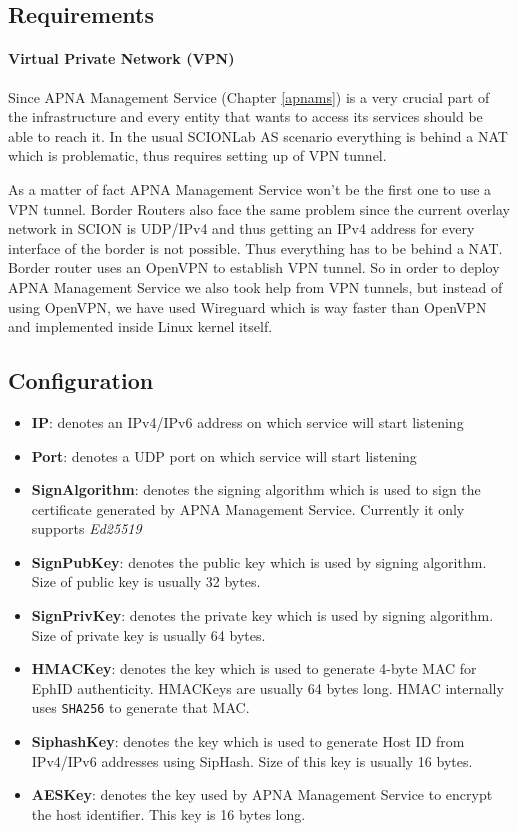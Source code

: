 \subsection{Requirements}
\paragraph{Virtual Private Network (VPN)}
Since APNA Management Service (Chapter \ref{apnams}) is a very crucial part of the infrastructure and every entity that wants to access its services should be able to reach it. In the usual SCIONLab AS scenario everything is behind a NAT which is problematic, thus requires setting up of VPN tunnel. 

As a matter of fact APNA Management Service won't be the first one to use a VPN tunnel. Border Routers also face the same problem since the current overlay network in SCION is UDP/IPv4 and thus getting an IPv4 address for every interface of the border is not possible. Thus everything has to be behind a NAT. Border router uses an OpenVPN to establish VPN tunnel. So in order to deploy APNA Management Service we also took help from VPN tunnels, but instead of using OpenVPN, we have used Wireguard \cite{wireguard} which is way faster than OpenVPN and implemented inside Linux kernel itself.

\subsection{Configuration}
\begin{itemize}
    \item \textbf{IP}: denotes an IPv4/IPv6 address on which service will start listening
    \item \textbf{Port}: denotes a UDP port on which service will start listening
    \item \textbf{SignAlgorithm}: denotes the signing algorithm which is used to sign the certificate generated by APNA Management Service. Currently it only supports \textit{Ed25519}
    \item \textbf{SignPubKey}: denotes the public key which is used by signing algorithm. Size of public key is usually 32 bytes.
    \item \textbf{SignPrivKey}: denotes the private key which is used by signing algorithm. Size of private key is usually 64 bytes.
    \item \textbf{HMACKey}: denotes the key which is used to generate 4-byte MAC for EphID authenticity. HMACKeys are usually 64 bytes long. HMAC internally uses \texttt{SHA256} to generate that MAC.
    \item \textbf{SiphashKey}: denotes the key which is used to generate Host ID from IPv4/IPv6 addresses using SipHash. Size of this key is usually 16 bytes.
    \item \textbf{AESKey}: denotes the key used by APNA Management Service to encrypt the host identifier. This key is 16 bytes long.
\end{itemize}

